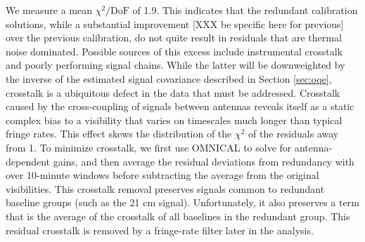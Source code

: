 \documentclass[twocolumn,numberedappendix]{emulateapj} \shorttitle{New Limits on the 21 cm Power Spectrum at $z=8.4$}
\begin{document}
We measure a mean $\chi^{2}/\text{DoF}$ of 1.9.  This
indicates that the redundant calibration solutions, while a substantial improvement
[XXX be specific here for previous]
over the previous calibration, do not quite result in residuals that are thermal noise dominated.
Possible sources of this excess include instrumental crosstalk and poorly performing signal chains.
While the latter will be downweighted by the inverse of the estimated signal covariance described
in Section \ref{sec:oqe}, crosstalk is a ubiquitous defect in the data that must be addressed.
Crosstalk caused by the cross-coupling of signals between antennas
reveals itself as a static complex bias to a
visibility that varies on timescales much longer than typical fringe rates.
This effect 
skews the distribution of the $\chi^2$ of the residuals away from 1.
To minimize crosstalk, we first use OMNICAL to solve for antenna-dependent gains,
and then average the residual deviations from redundancy with
over 10-minute windows before subtracting
the average from the original visibilities. This
crosstalk removal preserves signals common to redundant baseline groups (such as the 21 cm signal).
Unfortunately, it also preserves a term that is the average of the crosstalk of all baselines
in the redundant group.  This residual crosstalk is removed by a fringe-rate filter later
in the analysis.
\end{document}
